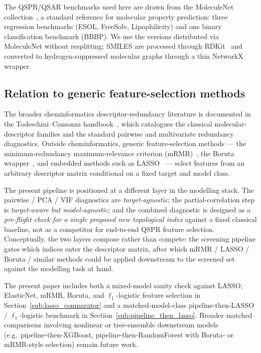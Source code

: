 \documentclass[STIX1COL]{WileyNJDv5}
\theoremstyle{definition}
\begin{document}
The QSPR/QSAR benchmarks used here are drawn from the MoleculeNet
collection~\cite{MoleculeNet}, a standard reference for molecular
property prediction: three regression benchmarks (ESOL, FreeSolv,
Lipophilicity) and one binary classification benchmark (BBBP). We
use the versions distributed via MoleculeNet without resplitting;
SMILES are processed through RDKit~\cite{RDKit} and converted to
hydrogen-suppressed molecular graphs through a thin NetworkX
wrapper.

\subsection{Relation to generic feature-selection methods}\label{sec:feature_selection}

The broader cheminformatics descriptor-redundancy literature is
documented in the Todeschini--Consonni
handbook~\cite{TodeschiniConsonniHandbook}, which catalogues the
classical molecular-descriptor families and the standard pairwise
and multivariate redundancy diagnostics. Outside cheminformatics,
generic feature-selection methods --- the minimum-redundancy
maximum-relevance criterion (mRMR)~\cite{PengLongDing2005},
the Boruta wrapper~\cite{KursaRudnicki2010}, and embedded
methods such as LASSO~\cite{Tibshirani1996} --- select features
from an arbitrary descriptor matrix conditional on a fixed target
and model class.

The present pipeline is positioned at a different layer in the
modelling stack. The pairwise / PCA / VIF diagnostics are
\emph{target-agnostic}; the partial-correlation step is
\emph{target-aware but model-agnostic}; and the combined diagnostic
is designed as a \emph{pre-flight check for a single proposed new
topological index} against a fixed classical baseline, not as a
competitor for end-to-end QSPR feature selection. Conceptually,
the two layers compose rather than compete: the screening pipeline
gates which indices enter the descriptor matrix, after which
mRMR / LASSO / Boruta / similar methods could be applied
downstream to the screened set against the modelling task at hand.

The present paper includes both a mixed-model sanity check
against LASSO, ElasticNet, mRMR, Boruta, and $\ell_1$-logistic
feature selection in Section~\ref{sub:lasso_comparator} and a
matched-model-class pipeline-then-LASSO / $\ell_1$-logistic
benchmark in Section~\ref{sub:pipeline_then_lasso}. Broader
matched comparisons involving nonlinear or tree-ensemble
downstream models (e.g.\ pipeline-then-XGBoost,
pipeline-then-RandomForest with Boruta- or mRMR-style selection)
remain future work.
\end{document}
